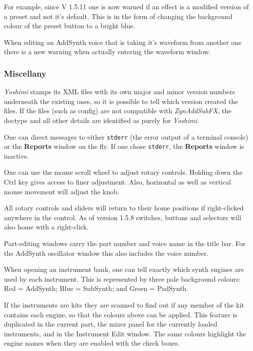 \documentclass[
 11pt,
 twoside,
 a4paper,
 final                                 %
]{article}
\begin{document}
   For example, since V 1.5.11 one is now warned if an effect is a modified
   version of a preset and not it's default. This is in the form of changing
   the background colour of the preset button to a bright blue.

   When editing an AddSynth voice that is taking it's waveform from another one
   there is a new warning when actually entering the waveform window.

\subsubsection{Miscellany}
\label{subsubsec:new_features_miscellany}

   \textsl{Yoshimi} stamps its XML files
   with its own major
   and minor version numbers underneath the existing ones, so it is possible
   to tell which version created the files.
   If the files (such as config) are not compatible with
   \textsl{ZynAddSubFX},
   the doctype and all other details are identified as purely for
   \textsl{Yoshimi}.

   One can direct messages to either \texttt{stderr}
   (the error output of a terminal console) or the \textbf{Reports} window
   on the fly. If one chose \texttt{stderr}, the \textbf{Reports} window is
   inactive.

   One can use the mouse scroll wheel to adjust rotary controls. Holding
   down the Ctrl key gives access to finer adjustment.  Also, horizontal as
   well as vertical mouse movement will adjust the knob.

   All rotary controls and sliders will return
   to their home positions if right-clicked anywhere in the control.
   As of version 1.5.8 switches, buttons and
   selectors will also home with a right-click.

   Part-editing windows carry the part number and voice name in the title
   bar. For the AddSynth oscillator window this also includes the voice
   number.

   When opening an instrument bank, one can tell exactly which synth
   engines are used by each instrument. This is represented by three pale
   background colours: Red = AddSynth; Blue = SubSynth; and Green = PadSynth.

   If the instruments are kits they are scanned to find out if any member of the
   kit contains each engine, so that the colours above can be applied.
   This feature is duplicated in the current part, the mixer panel for the
   currently loaded instruments, and in the Instrument Edit window.
   The same colours highlight the engine names when they are enabled with the
   check boxes.
\end{document}
